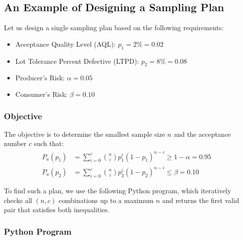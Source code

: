 \documentclass[twoside]{book}
\begin{document}
\subsection{An Example of Designing a Sampling Plan}

Let us design a single sampling plan based on the following requirements:
\begin{itemize}
    \item Acceptance Quality Level (AQL): $p_1 = 2\% = 0.02$
    \item Lot Tolerance Percent Defective (LTPD): $p_2 = 8\% = 0.08$
    \item Producer's Risk: $\alpha = 0.05$
    \item Consumer's Risk: $\beta = 0.10$
\end{itemize}

\subsubsection{Objective}

The objective is to determine the smallest sample size $n$ and the acceptance number $c$ such that:
\begin{align*}
    P_a(p_1) &= \sum_{i=0}^c \binom{n}{i} p_1^i (1 - p_1)^{n - i} \ge 1 - \alpha = 0.95 \\
    P_a(p_2) &= \sum_{i=0}^c \binom{n}{i} p_2^i (1 - p_2)^{n - i} \le \beta = 0.10
\end{align*}

To find such a plan, we use the following Python program, which iteratively checks all $(n, c)$ combinations up to a maximum $n$ and returns the first valid pair that satisfies both inequalities.

\subsubsection{Python Program}
\end{document}
